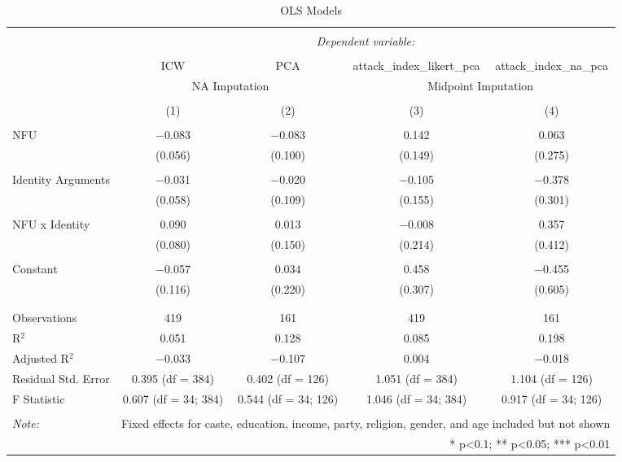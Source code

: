 \documentclass[12pt]{article}
\begin{document}
\newpage
\begin{landscape}
\begin{table}[!htbp] \centering 
  \caption{OLS Models} 
  \label{} 
\begin{tabular}{@{\extracolsep{5pt}}lcccc} 
\\[-1.8ex]\hline 
\hline \\[-1.8ex] 
 & \multicolumn{4}{c}{\textit{Dependent variable:}} \\ 
\cline{2-5} 
\\[-1.8ex] & ICW & PCA & attack\_index\_likert\_pca & attack\_index\_na\_pca \\ 
 & \multicolumn{2}{c}{NA Imputation} & \multicolumn{2}{c}{Midpoint Imputation} \\ 
\\[-1.8ex] & (1) & (2) & (3) & (4)\\ 
\hline \\[-1.8ex] 
 NFU & $-$0.083 & $-$0.083 & 0.142 & 0.063 \\ 
  & (0.056) & (0.100) & (0.149) & (0.275) \\ 
  & & & & \\ 
 Identity Arguments & $-$0.031 & $-$0.020 & $-$0.105 & $-$0.378 \\ 
  & (0.058) & (0.109) & (0.155) & (0.301) \\ 
  & & & & \\ 
 NFU x Identity & 0.090 & 0.013 & $-$0.008 & 0.357 \\ 
  & (0.080) & (0.150) & (0.214) & (0.412) \\ 
  & & & & \\ 
 Constant & $-$0.057 & 0.034 & 0.458 & $-$0.455 \\ 
  & (0.116) & (0.220) & (0.307) & (0.605) \\ 
  & & & & \\ 
\hline \\[-1.8ex] 
Observations & 419 & 161 & 419 & 161 \\ 
R$^{2}$ & 0.051 & 0.128 & 0.085 & 0.198 \\ 
Adjusted R$^{2}$ & $-$0.033 & $-$0.107 & 0.004 & $-$0.018 \\ 
Residual Std. Error & 0.395 (df = 384) & 0.402 (df = 126) & 1.051 (df = 384) & 1.104 (df = 126) \\ 
F Statistic & 0.607 (df = 34; 384) & 0.544 (df = 34; 126) & 1.046 (df = 34; 384) & 0.917 (df = 34; 126) \\ 
\hline 
\hline \\[-1.8ex] 
\textit{Note:}  & \multicolumn{4}{r}{Fixed effects for caste, education, income, party, religion, gender, and age included but not shown} \\ 
 & \multicolumn{4}{r}{* p<0.1; ** p<0.05; *** p<0.01} \\ 
\end{tabular} 
\end{table}
\end{landscape}
\newpage
\end{document}
